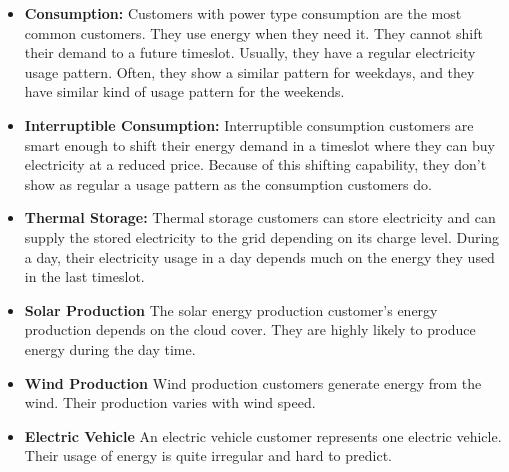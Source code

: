 \begin{itemize}
\item \textbf{Consumption: } Customers with power type consumption are the most common customers. They use energy when they need it. They cannot shift their demand to a future timeslot. Usually, they have a regular electricity usage pattern. Often, they show a similar pattern for weekdays, and they have similar kind of usage pattern for the weekends. 


\item \textbf{Interruptible Consumption: }
Interruptible consumption customers are smart enough to shift their energy demand in a timeslot where they can buy electricity at a reduced price. Because of this shifting capability, they don't show as regular a usage pattern as the consumption customers do. 

\item \textbf{Thermal Storage: }
Thermal storage customers can store electricity and can supply the stored electricity to the grid depending on its charge level. During a day, their electricity usage in a day depends  much on the energy they used in the last timeslot. 


\item \textbf{Solar Production}
The solar energy production customer's energy production depends on the cloud cover. They are highly likely to produce energy during the day time.

\item\textbf{Wind Production} Wind production customers generate energy from the wind. Their production varies with wind speed.
\item \textbf{Electric Vehicle} An electric vehicle customer represents one electric vehicle. Their usage of energy is quite irregular and hard to predict. \\
\end{itemize}


